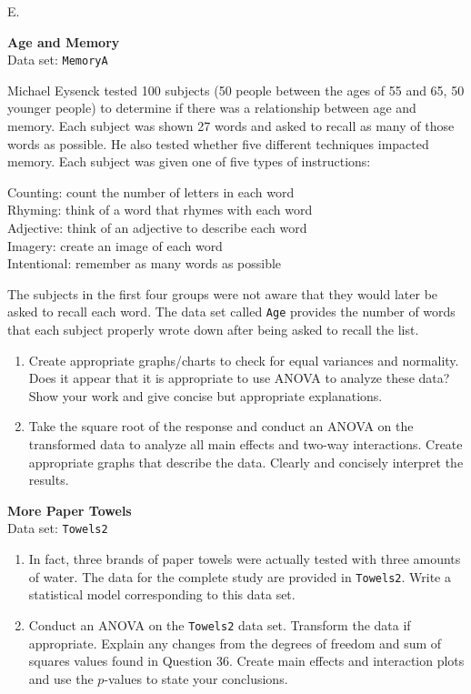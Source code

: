 \documentclass[
]{report}
\newcounter{excount}
\renewcommand{\theexcount}{E\arabic{excount}}
\begin{document}
\begin{list}{\theexcount.}{ \setlength{\itemsep}{1.2em}}
  \item \textbf{Age and Memory}\\
  Data set: \texttt{MemoryA}

Michael Eysenck tested 100 subjects (50 people between the ages of 55 and 65, 50 younger people) to determine if there was a relationship between age and memory. Each subject was shown 27 words and asked to recall as many of those words as possible. He also tested whether five different techniques impacted memory. Each subject was given one of five types of instructions:

Counting: count the number of letters in each word \\
Rhyming: think of a word that rhymes with each word \\
Adjective: think of an adjective to describe each word \\
Imagery: create an image of each word \\
Intentional: remember as many words as possible

The subjects in the first four groups were not aware that they would later be asked to recall each word. The data set called \texttt{Age} provides the number of words that each subject properly wrote down after being asked to recall the list.

  \begin{enumerate}
    \item Create appropriate graphs/charts to check for equal variances and normality. Does it appear that it is appropriate to use ANOVA to analyze these data? Show your work and give concise but appropriate explanations.
    \item Take the square root of the response and conduct an ANOVA on the transformed data to analyze all main effects and two-way interactions. Create appropriate graphs that describe the data. Clearly and concisely interpret the results.
  \end{enumerate}

  \item \textbf{More Paper Towels}\\
  Data set: \texttt{Towels2}
  \begin{enumerate}
    \item In fact, three brands of paper towels were actually tested with three amounts of water. The data for the complete study are provided in \texttt{Towels2}. Write a statistical model corresponding to this data set.
    \item Conduct an ANOVA on the \texttt{Towels2} data set. Transform the data if appropriate. Explain any changes from the degrees of freedom and sum of squares values found in Question 36. Create main effects and interaction plots and use the $p$-values to state your conclusions.
  \end{enumerate}


\end{list}
\end{document}
